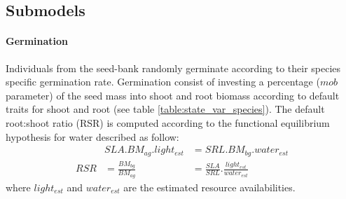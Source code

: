 \documentclass[a4paper,twoside, justified,marginals=raggedright, nobib]{tufte-handout}
\begin{document}
\subsection{Submodels}

\paragraph{Germination} Individuals from the seed-bank randomly germinate according to their species specific germination rate. Germination consist of investing a percentage ($mob$ parameter) of the seed mass into shoot and root biomass according to default traits for shoot and root (see table \ref{table:state_var_species}). The default root:shoot ratio (RSR) is computed according to the functional equilibrium hypothesis for water described as follow:
\begin{align}\label{eq:equilibrium}
& SLA . BM_{ag} . light_{est} &= SRL . BM_{bg} . water_{est}\\
RSR &= \frac{BM_{bg}}{BM_{ag}} &= \frac{SLA}{SRL} . \frac{light_{est}}{water_{est}}
\end{align}
where $light_{est}$ and $water_{est}$ are the estimated resource availabilities.
%
\end{document}
